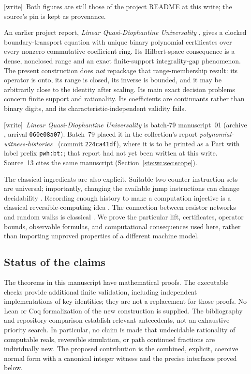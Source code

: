 \documentclass[11pt,letterpaper]{article}
\theoremstyle{definition}
\theoremstyle{remark}
\newcommand{\wtag}{\textup{[write]}}
\begin{document}
\wtag\ Both figures are still those of the project README at this write; the source's pin is kept as provenance.

An earlier project report, \emph{Linear Quasi-Diophantine Universality}
\cite{linearreport}, gives a clocked boundary-transport equation with unique
binary polynomial certificates over every nonzero commutative coefficient
ring. Its Hilbert-space consequence is a dense, nonclosed range and an exact
finite-support integrality-gap phenomenon. The present construction does
\emph{not} repackage that range-membership result: its operator is onto,
its range is closed, its inverse is bounded, and it may be arbitrarily close
to the identity after scaling. Its main exact decision problems concern
finite support and rationality. Its coefficients are continuants rather
than binary digits, and its characteristic-independent validity fails.

\wtag\ \emph{Linear Quasi-Diophantine Universality} is batch-79 manuscript~01 (archive , arrival \texttt{060e08a07}). Batch~79 placed it in the collection's report \emph{polynomial-witness-histories}~\cite{pwh} (commit \texttt{224ca41df}), where it is to be printed as a Part with label prefix \texttt{pwh:bt:}; that report had not yet been written at this write. Source~13 cites the same manuscript (Section~\ref{ste:wc:sec:scope}).

The classical ingredients are also explicit. Suitable two-counter
instruction sets are universal; importantly, changing the available jump
instructions can change decidability \cite{dudenhefner}. Recording enough
history to make a computation injective is a classical reversible-computing
idea \cite{bennett}. The connection between resistor networks and random
walks is classical \cite{doyle}. We prove the particular lift, certificates,
operator bounds, observable formulas, and computational consequences used
here, rather than importing unproved properties of a different machine
model.

\subsection{Status of the claims}
The theorems in this manuscript have mathematical proofs. The executable
checks provide additional finite validation, including independent
implementations of key identities; they are not a replacement for those
proofs. No Lean or Coq formalization of the new construction is supplied.
The bibliography and repository comparison establish relevant antecedents,
not an exhaustive priority search. In particular, no claim is made that
undecidable rationality of computable reals, reversible simulation, or path
continued fractions are individually new. The proposed contribution is
the combined, explicit, coercive normal form with a canonical integer
witness and the precise interfaces proved below.
\end{document}
